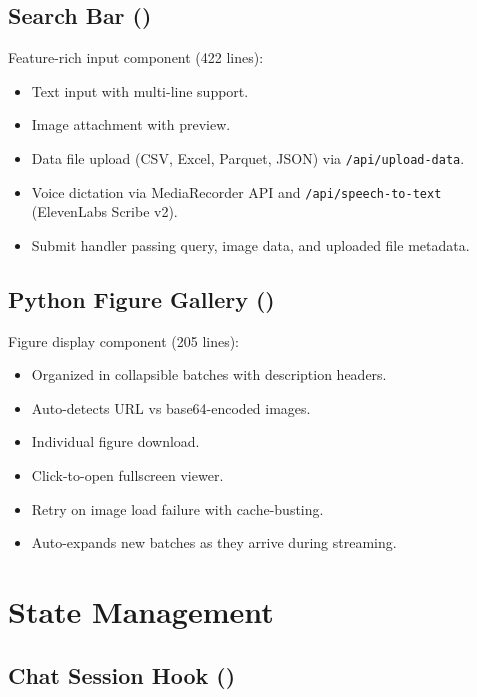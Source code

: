\subsection{Search Bar ()}

Feature-rich input component (422 lines):

\begin{itemize}
  \item Text input with multi-line support.
  \item Image attachment with preview.
  \item Data file upload (CSV, Excel, Parquet, JSON) via \texttt{/api/upload-data}.
  \item Voice dictation via MediaRecorder API and \texttt{/api/speech-to-text} (ElevenLabs Scribe v2).
  \item Submit handler passing query, image data, and uploaded file metadata.
\end{itemize}

\subsection{Python Figure Gallery ()}

Figure display component (205 lines):

\begin{itemize}
  \item Organized in collapsible batches with description headers.
  \item Auto-detects URL vs base64-encoded images.
  \item Individual figure download.
  \item Click-to-open fullscreen viewer.
  \item Retry on image load failure with cache-busting.
  \item Auto-expands new batches as they arrive during streaming.
\end{itemize}

\section{State Management}
\label{sec:frontend:state}

\subsection{Chat Session Hook ()}

